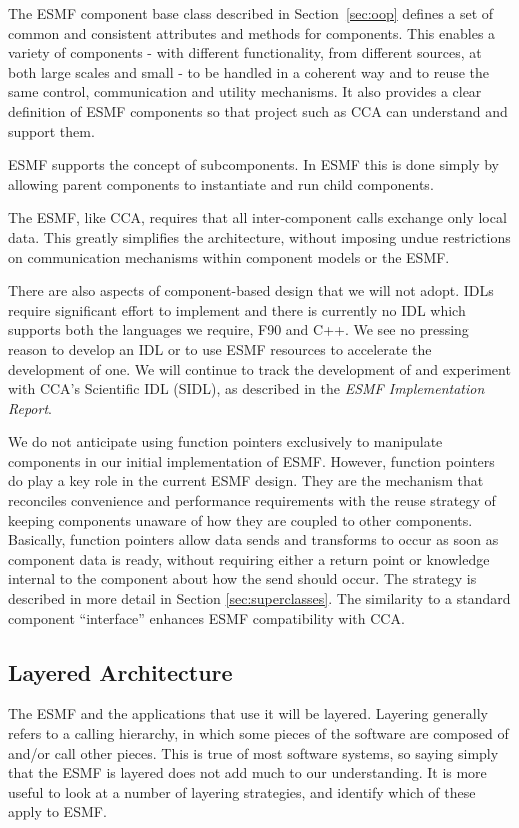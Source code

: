 The ESMF component base class described in Section~\ref{sec:oop} defines a set 
of common and consistent attributes
and methods for components.  This enables a variety of components - with different functionality, from different sources, at both large scales and small - to be handled
in a coherent way and to reuse the same control, communication and utility
mechanisms.  It also provides a clear definition of ESMF components so that
project such as CCA can understand and support them.  

ESMF supports the concept of subcomponents.  In ESMF this is done simply
by allowing parent components to instantiate and run child components.

The ESMF, like CCA, requires that all inter-component calls exchange only
local data.  This greatly simplifies the architecture, without 
imposing undue restrictions on communication mechanisms within component
models or the ESMF.

There are also aspects of component-based design that we will not adopt.
IDLs require significant effort to implement and there is currently no
IDL which supports both the languages we require, F90 and C++.  We see 
no pressing
reason to develop an IDL or to use ESMF resources to accelerate the development
of one.  We will continue to track the 
development of and experiment with CCA's Scientific IDL (SIDL), 
as described in the {\it ESMF Implementation Report}.

We do not anticipate using function pointers exclusively to manipulate
components in our initial implementation of ESMF.  However, function 
pointers do play a key role in the current ESMF design.  They are 
the mechanism that reconciles convenience and performance requirements 
with the reuse
strategy of keeping components unaware of how they are coupled to
other components.  Basically, function pointers allow data sends and 
transforms to 
occur as soon as component data is ready, without requiring either a return
point or knowledge internal to the component about how the send should occur.
The strategy is described in more detail in Section \ref{sec:superclasses}.
The similarity to a standard component ``interface'' enhances ESMF 
compatibility with CCA.

\subsection{Layered Architecture}

The ESMF and the applications that use it will be layered.  Layering generally 
refers to a calling hierarchy, in which some pieces of the software are composed 
of and/or call other pieces.  This is true of most software systems, so 
saying simply that the ESMF is layered does not add much to our understanding.  
It is more useful to look at a number of layering strategies, 
and identify which of these apply to ESMF.

